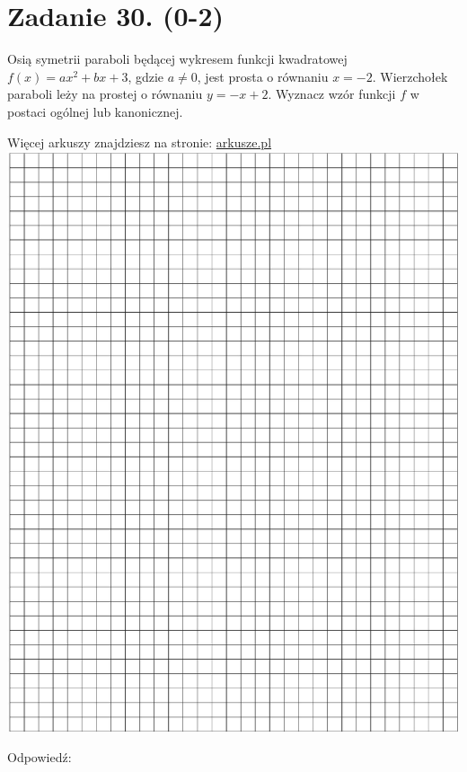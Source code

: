 \documentclass[10pt]{article}
\begin{document}
\section*{Zadanie 30. (0-2)}
Osią symetrii paraboli będącej wykresem funkcji kwadratowej \(f(x)=a x^{2}+b x+3\), gdzie \(a \neq 0\), jest prosta o równaniu \(x=-2\). Wierzchołek paraboli leży na prostej o równaniu \(y=-x+2\). Wyznacz wzór funkcji \(f\) w postaci ogólnej lub kanonicznej.

Więcej arkuszy znajdziesz na stronie: \href{http://arkusze.pl}{arkusze.pl}\\
\includegraphics[max width=\textwidth, center]{2024_11_21_1e89351873aa60c4c1b9g-14}

Odpowiedź:
\end{document}
